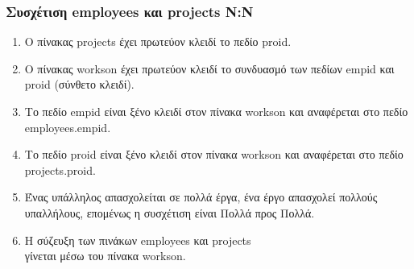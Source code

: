 \begin{frame}
\frametitle{Συσχέτιση {\en employees} και {\en projects} Ν:Ν}
\begin{minipage}{\wE}
\begin{enumerate} \itemsep 6pt %
  \item Ο πίνακας {\ra projects} έχει {\crr πρωτεύον κλειδί} το πεδίο {\ra proid}.
  \item Ο πίνακας {\ra workson} έχει {\crr πρωτεύον κλειδί} το συνδυασμό των πεδίων
        {\ra empid} και  {\ra proid} ({\crr σύνθετο κλειδί}).
  \item Το πεδίο {\ra empid} είναι {\cee ξένο κλειδί} στον πίνακα {\ra workson}
        και αναφέρεται στο πεδίο {\ra employees.empid}.
  \item Το πεδίο {\ra proid} είναι {\crr ξένο κλειδί} στον πίνακα {\ra workson}
        και αναφέρεται στο πεδίο {\ra projects.proid}.  
  \item Ένας υπάλληλος απασχολείται σε πολλά έργα, ένα έργο απασχολεί
        πολλούς υπαλλήλους,  επομένως η συσχέτιση είναι {\cee Πολλά προς Πολλά}.
  \item Η σύζευξη των πινάκων {\ra employees} και {\ra projects} \\ γίνεται
        μέσω του πίνακα {\ra workson}.
\end{enumerate}
\end{minipage}
\end{frame}



